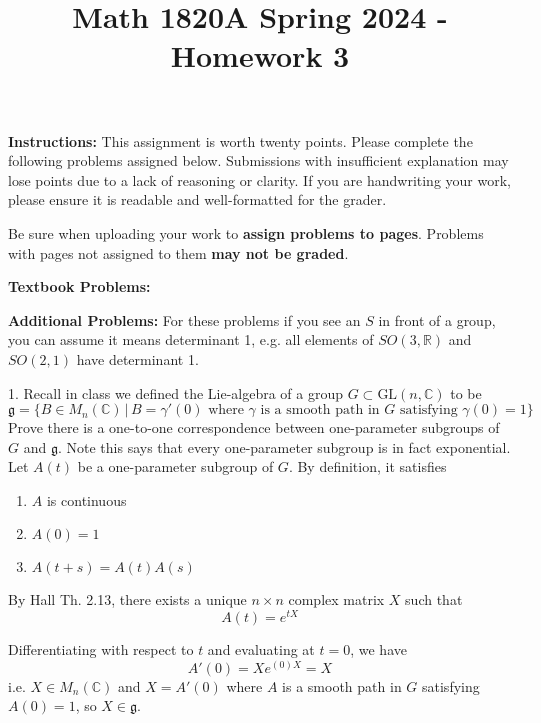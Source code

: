 \documentclass[11pt]{article}
\title{Math 1820A Spring 2024 - Homework 3}
\date{}
\newcommand{\C}{\mathbb{C}}
\newcommand{\R}{\mathbb{R}}
\newcommand{\GL}{\text{GL}}
\newcommand{\gf}{\mathfrak{g}}
\begin{document}
\maketitle
\vspace{-0.5in}

\noindent \textbf{Instructions:}  This assignment is worth twenty points.  Please complete the following problems assigned below.  Submissions with insufficient explanation may lose points due to a lack of reasoning or clarity.  If you are handwriting your work, please ensure it is readable and well-formatted for the grader.

Be sure when uploading your work to \textbf{assign problems to pages}.  Problems with pages not assigned to them \textbf{may not be graded}.  


\vspace{10mm}\noindent
\textbf{Textbook Problems: }  
\vspace{10mm}\noindent

\noindent
\textbf{Additional Problems:}   For these problems if you see an $S$ in front of a group, you can assume it means determinant 1, e.g. all elements of $SO(3,\R)$ and $SO(2,1)$ have determinant 1.
\vspace{10mm}\noindent

1.  Recall in class we defined the Lie-algebra of a group $G \subset \GL(n,\C)$ to be 
\[\mathfrak{g} = \{B \in M_{n}(\C) \, | \, B = \gamma'(0) \text{ where }\gamma \text{ is a smooth path in }G\text{ satisfying }\gamma(0) = 1\}
\]
Prove there is a one-to-one correspondence between one-parameter subgroups of $G$ and $\mathfrak{g}$.  Note this says that every one-parameter subgroup is in fact exponential.  \\

	\color{blue}
		Let $A(t)$ be a one-parameter subgroup of $G$. By definition, it satisfies 
		\begin{enumerate}
			\item $A$ is continuous 
			\item $A(0) = 1$
			\item $A(t+s) = A(t)A(s)$
		\end{enumerate}

		By Hall Th. 2.13, there exists a unique $n \times n$ complex matrix $X$ such that 
		\[A(t) = e^{tX}\]

		Differentiating with respect to $t$ and evaluating at $t=0$, we have 
		\[A'(0) = Xe^{(0)X} = X\]
		i.e. $X \in M_n(\C)$ and $X = A'(0)$ where $A$ is a smooth path in $G$ satisfying $A(0) = 1$, so $X \in \gf$.  
\end{document}
